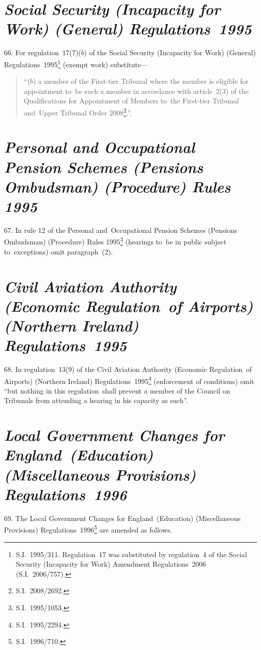 \documentclass[12pt,a4paper]{article}
\begin{document}
\section*{\itshape Social Security (Incapacity for Work) (General) Regulations~1995}

66.  For regulation~17(7)($b$)  of the Social Security (Incapacity for Work) (General) Regulations~1995\footnote{S.I.~1995/311. Regulation~17 was substituted by regulation~4 of the Social Security (Incapacity for Work) Amendment Regulations~2006 (S.I.~2006/757).} (exempt work) substitute—
\begin{quotation}
“($b$) a member of the First-tier Tribunal where the member is eligible for appointment to~be such a member in accordance with article~2(3) of the Qualifications for Appointment of Members to~the First-tier Tribunal and~Upper Tribunal Order 2008\footnote{S.I.~2008/2692.}.”.
\end{quotation}

\section*{\itshape\sloppy Personal and Occupational Pension Schemes (Pensions Ombudsman) (Procedure) Rules 1995}

67.  In rule 12 of the Personal and~Occupational Pension Schemes (Pensions Ombudsman) (Procedure) Rules 1995\footnote{S.I.~1995/1053.} (hearings to~be in public subject to~exceptions) omit paragraph~(2).

\section*{\itshape Civil Aviation Authority (Economic Regulation~of Airports) (Northern Ireland) Regulations~1995}

68.  In regulation~13(9) of the Civil Aviation Authority (Economic Regulation~of Airports) (Northern Ireland) Regulations~1995\footnote{S.I.~1995/2294.} (enforcement of conditions) omit “but nothing in this regulation~shall prevent a member of the Council on Tribunals from attending a hearing in his capacity as such”.

\section*{\itshape Local Government Changes for England~(Education) (Miscellaneous Provisions) Regulations~1996}

69.  The Local Government Changes for England~(Education) (Miscellaneous Provisions) Regulations~1996\footnote{S.I.~1996/710.} are amended as follows.
\end{document}
